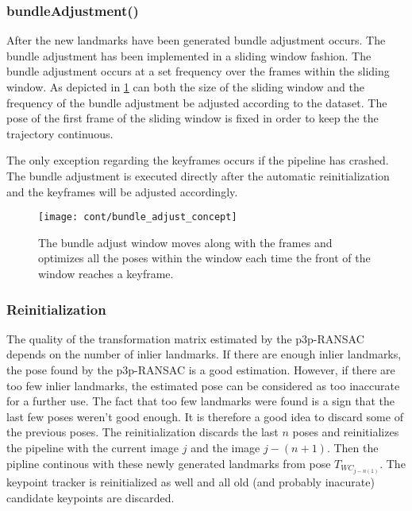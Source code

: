 \subsubsection{bundleAdjustment()}
\label{ba_cont}
After the new landmarks have been generated bundle adjustment occurs. The bundle adjustment has been implemented in a sliding window fashion. The bundle adjustment occurs at a set frequency over the frames within the sliding window. As depicted in \cref{fig:ba_concept} can both the size of the sliding window and the frequency of the bundle adjustment be adjusted according to the dataset. The pose of the first frame of the sliding window is fixed in order to keep the the trajectory continuous.

The only exception regarding the keyframes occurs if the pipeline has crashed. The bundle adjustment is executed directly after the automatic reinitialization and the keyframes will be adjusted accordingly.

\begin{figure}[!!h]
	\centering
	\texttt{[image: cont/bundle\_adjust\_concept]}
	\caption{The bundle adjust window moves along with the frames and optimizes all the poses within the window each time the front of the window reaches a keyframe.}
	\label{fig:ba_concept}
\end{figure}

\subsubsection{Reinitialization}
The quality of the transformation matrix estimated by the p3p-RANSAC depends on the number of inlier landmarks. If there are enough inlier landmarks, the pose found by the p3p-RANSAC is a good estimation. However, if there are too few inlier landmarks, the estimated pose can be considered as too inaccurate for a further use. The fact that too few landmarks were found is a sign that the last few poses weren't good enough. It is therefore a good idea to discard some of the previous poses. The reinitialization discards the last \begin{math} n \end{math} poses and reinitializes the pipeline with the current image \begin{math} j \end{math} and the image \begin{math} j-(n+1) \end{math}. Then the pipline continous with these newly generated landmarks from pose $T_{WC_{j-n(1)}}$. The keypoint tracker is reinitialized as well and all old (and probably inacurate) candidate keypoints are discarded.